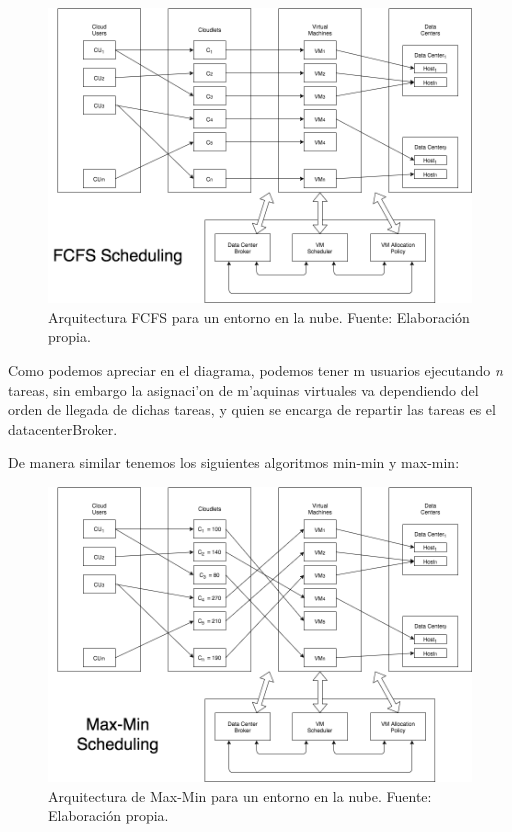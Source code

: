 \begin{figure}
	\caption{Arquitectura FCFS para un entorno en la nube. Fuente: Elaboración propia.}
	\centering
	\includegraphics[scale=0.5]{media/imagentres}
\end{figure}

Como podemos apreciar en el diagrama, podemos tener m usuarios ejecutando \emph{n} tareas, sin embargo la asignaci'on de m'aquinas virtuales va dependiendo del orden de llegada de dichas tareas, y quien se encarga de repartir las tareas es el datacenterBroker.

De manera similar tenemos los siguientes algoritmos min-min y max-min:



\begin{figure}
	\caption{Arquitectura de Max-Min para un entorno en la nube. Fuente: Elaboración propia.}
	\centering
	\includegraphics[scale=0.5]{media/imagencuatro}
\end{figure}


